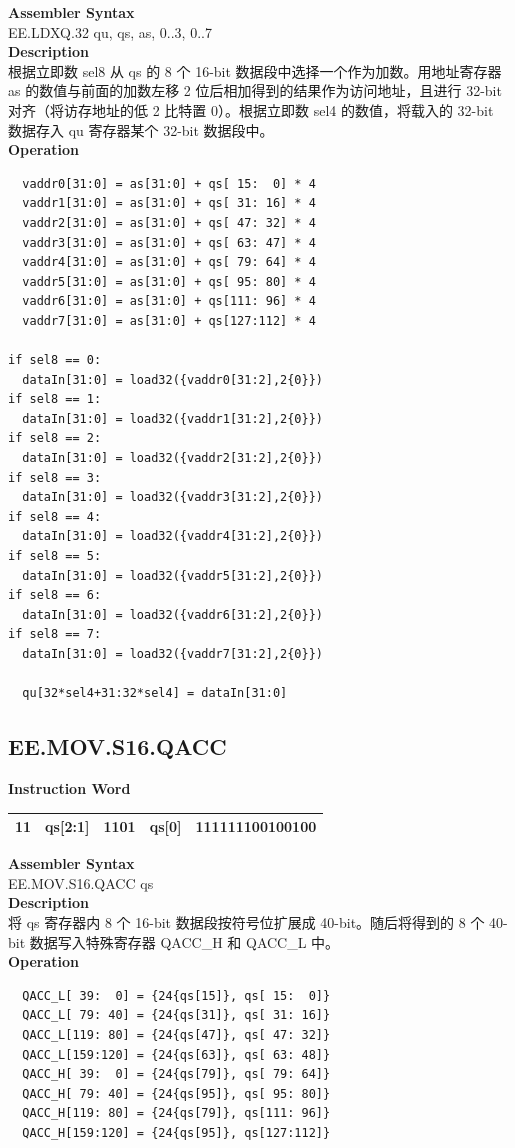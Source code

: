 \textbf{Assembler Syntax} \\
EE.LDXQ.32 qu, qs, as, 0..3, 0..7 \\
\textbf{Description} \\
根据立即数 sel8 从 qs 的 8 个 16-bit 数据段中选择一个作为加数。用地址寄存器 as 的数值与前面的加数左移 2 位后相加得到的结果作为访问地址，且进行 32-bit 对齐（将访存地址的低 2 比特置 0）。根据立即数 sel4 的数值，将载入的 32-bit 数据存入 qu 寄存器某个 32-bit 数据段中。\\
\textbf{Operation}
\begin{lstlisting}
  vaddr0[31:0] = as[31:0] + qs[ 15:  0] * 4
  vaddr1[31:0] = as[31:0] + qs[ 31: 16] * 4
  vaddr2[31:0] = as[31:0] + qs[ 47: 32] * 4
  vaddr3[31:0] = as[31:0] + qs[ 63: 47] * 4
  vaddr4[31:0] = as[31:0] + qs[ 79: 64] * 4
  vaddr5[31:0] = as[31:0] + qs[ 95: 80] * 4
  vaddr6[31:0] = as[31:0] + qs[111: 96] * 4
  vaddr7[31:0] = as[31:0] + qs[127:112] * 4

if sel8 == 0:
  dataIn[31:0] = load32({vaddr0[31:2],2{0}})
if sel8 == 1:
  dataIn[31:0] = load32({vaddr1[31:2],2{0}})
if sel8 == 2:
  dataIn[31:0] = load32({vaddr2[31:2],2{0}})
if sel8 == 3:
  dataIn[31:0] = load32({vaddr3[31:2],2{0}})
if sel8 == 4:
  dataIn[31:0] = load32({vaddr4[31:2],2{0}})
if sel8 == 5:
  dataIn[31:0] = load32({vaddr5[31:2],2{0}})
if sel8 == 6:
  dataIn[31:0] = load32({vaddr6[31:2],2{0}})
if sel8 == 7:
  dataIn[31:0] = load32({vaddr7[31:2],2{0}})

  qu[32*sel4+31:32*sel4] = dataIn[31:0]
\end{lstlisting}

\clearpage
\subsection{EE.MOV.S16.QACC}\label{instruction:EEMOVS16QACC}
\setlength\tabcolsep{6pt}
\textbf{Instruction Word} \\
\begin{tabular}{|c|c|c|c|c|}
	\hline
	11 & qs[2:1] & 1101 & qs[0] & 111111100100100 \\
	\hline
\end{tabular}

\textbf{Assembler Syntax} \\
EE.MOV.S16.QACC qs \\
\textbf{Description} \\
将 qs 寄存器内 8 个 16-bit 数据段按符号位扩展成 40-bit。随后将得到的 8 个 40-bit 数据写入特殊寄存器 QACC\_H 和 QACC\_L 中。\\
\textbf{Operation}
\begin{lstlisting}
  QACC_L[ 39:  0] = {24{qs[15]}, qs[ 15:  0]}
  QACC_L[ 79: 40] = {24{qs[31]}, qs[ 31: 16]}
  QACC_L[119: 80] = {24{qs[47]}, qs[ 47: 32]}
  QACC_L[159:120] = {24{qs[63]}, qs[ 63: 48]}
  QACC_H[ 39:  0] = {24{qs[79]}, qs[ 79: 64]}
  QACC_H[ 79: 40] = {24{qs[95]}, qs[ 95: 80]}
  QACC_H[119: 80] = {24{qs[79]}, qs[111: 96]}
  QACC_H[159:120] = {24{qs[95]}, qs[127:112]}
\end{lstlisting}


